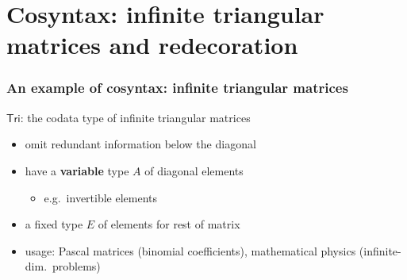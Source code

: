 \documentclass[
serif,
mathsans,
]
{beamer}
\newcommand{\constfont}[1]{\ensuremath{\mathsf{#1}}}
\newcommand{\Tri}{\constfont{Tri}}
\newcommand{\fat}[1]{\textbf{#1}}
\begin{document}
\section{Cosyntax: infinite triangular matrices and redecoration}

\begin{frame}
 \frametitle{An example of cosyntax: infinite triangular matrices}
 
   \begin{block}{\Tri: the codata type of infinite triangular matrices}
     \begin{itemize}
      \item omit redundant information below the diagonal
      \item have a \fat{variable} type $A$ of diagonal elements 
        \begin{itemize} 
          \item e.g.\ invertible elements
        \end{itemize}
      \item a fixed type $E$ of elements for rest of matrix
      \item usage: Pascal matrices (binomial coefficients), mathematical physics (infinite-dim.\ problems)
     \end{itemize}
   \end{block}
   
   
\begin{center}
   
 
%

\end{center}
 

   
\end{frame}
\end{document}
